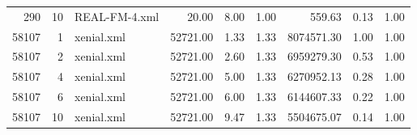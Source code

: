 \begin{table}[ht]
\begin{tabular}{rrlrrrrrr}
  290 &  10 & REAL-FM-4.xml & 20.00 & 8.00 & 1.00 & 559.63 & 0.13 & 1.00 \\ 
  58107 &   1 & xenial.xml & 52721.00 & 1.33 & 1.33 & 8074571.30 & 1.00 & 1.00 \\ 
  58107 &   2 & xenial.xml & 52721.00 & 2.60 & 1.33 & 6959279.30 & 0.53 & 1.00 \\ 
  58107 &   4 & xenial.xml & 52721.00 & 5.00 & 1.33 & 6270952.13 & 0.28 & 1.00 \\ 
  58107 &   6 & xenial.xml & 52721.00 & 6.00 & 1.33 & 6144607.33 & 0.22 & 1.00 \\ 
  58107 &  10 & xenial.xml & 52721.00 & 9.47 & 1.33 & 5504675.07 & 0.14 & 1.00 \\ 
   \hline
\end{tabular}
\end{table}
